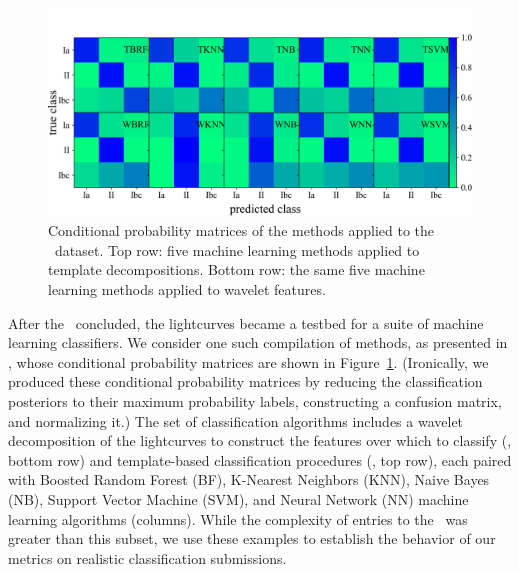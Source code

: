 \begin{figure}
	\begin{center}
    \includegraphics[width=\textwidth]{./fig/all_snphotcc_cm.png}
		\caption{Conditional probability matrices of the \citet{lochner_photometric_2016} methods applied to the \snphotcc\ dataset.
    Top row: five machine learning methods applied to template decompositions.
    Bottom row: the same five machine learning methods applied to wavelet features.
		}
		\label{fig:snphotcc_cm}
	\end{center}
\end{figure}

After the \snphotcc\ concluded, the lightcurves became a testbed for a suite of machine learning classifiers.
We consider one such compilation of methods, as presented in \citet{lochner_photometric_2016}, whose conditional probability matrices are shown in Figure~\ref{fig:snphotcc_cm}.
(Ironically, we produced these conditional probability matrices by reducing the classification posteriors to their maximum probability labels, constructing a confusion matrix, and normalizing it.)
The set of classification algorithms includes a wavelet decomposition of the lightcurves to construct the features over which to classify (\citet{newling_statistical_2011}, bottom row) and template-based classification procedures (\citet{sako_photometric_2011}, top row), each paired with Boosted Random Forest (BF), K-Nearest Neighbors (KNN), Naive Bayes (NB), Support Vector Machine (SVM), and Neural Network (NN) machine learning algorithms (columns).
While the complexity of entries to the \snphotcc\ was greater than this subset, we use these examples to establish the behavior of our metrics on realistic classification submissions.

